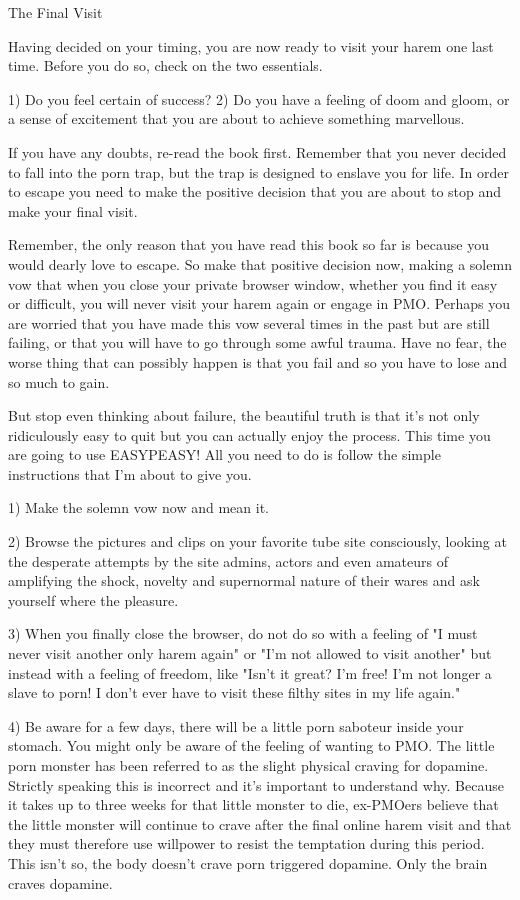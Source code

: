 The Final Visit

Having decided on your timing, you are now ready to visit your harem one last time. Before you do so, check on the two essentials.

  1) Do you feel certain of success?
  2) Do you have a feeling of doom and gloom, or a sense of excitement that you are about to achieve something marvellous.

If you have any doubts, re-read the book first. Remember that you never decided to fall into the porn trap, but the trap is designed to enslave you for life. In order to escape you need to make the positive decision that you are about to stop and make your final visit.

Remember, the only reason that you have read this book so far is because you would dearly love to escape. So make that positive decision now, making a solemn vow that when you close your private browser window, whether you find it easy or difficult, you will never visit your harem again or engage in PMO. Perhaps you are worried that you have made this vow several times in the past but are still failing, or that you will have to go through some awful trauma. Have no fear, the worse thing that can possibly happen is that you fail and so you have  to lose and so much to gain.

But stop even thinking about failure, the beautiful truth is that it's not only ridiculously easy to quit but you can actually enjoy the process. This time you are going to use EASYPEASY! All you need to do is follow the simple instructions that I'm about to give you.

  1) Make the solemn vow now and mean it.

  2) Browse the pictures and clips on your favorite tube site consciously, looking at the desperate attempts by the site admins, actors and even amateurs of amplifying the shock, novelty and supernormal nature of their wares and ask yourself where the pleasure.

  3) When you finally close the browser, do not do so with a feeling of "I must never visit another only harem again" or "I'm not allowed to visit another" but instead with a feeling of freedom, like "Isn't it great? I'm free! I'm not longer a slave to porn! I don't ever have to visit these filthy sites in my life again."

  4) Be aware for a few days, there will be a little porn saboteur inside your stomach. You might only be aware of the feeling of wanting to PMO. The little porn monster has been referred to as the slight physical craving for dopamine. Strictly speaking this is incorrect and it's important to understand why. Because it takes up to three weeks for that little monster to die, ex-PMOers believe that the little monster will continue to crave after the final online harem visit and that they must therefore use willpower to resist the temptation during this period. This isn't so, the body doesn't crave porn triggered dopamine. Only the brain craves dopamine.

